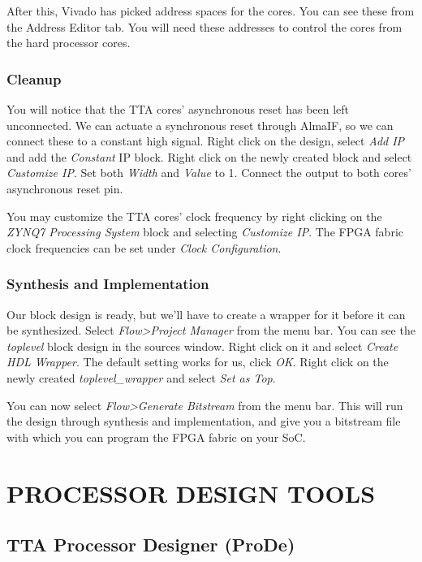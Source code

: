 \documentclass[twoside]{tceusermanual}
\begin{document}
After this, Vivado has picked address spaces for the cores. You can see these
from the Address Editor tab. You will need these addresses to control the cores
from the hard processor cores.

\subsection{Cleanup}

You will notice that the TTA cores' asynchronous reset has been left
unconnected. We can actuate a synchronous reset through AlmaIF, so we can
connect these to a constant high signal. Right click on the design, select
\textit{Add IP} and add the \textit{Constant} IP block. Right click on the
newly created block and select \textit{Customize IP}. Set both \textit{Width}
and \textit{Value} to 1. Connect the output to both cores' asynchronous reset
pin.

You may customize the TTA cores' clock frequency by right clicking on the
\textit{ZYNQ7 Processing System} block and selecting \textit{Customize IP}.
The FPGA fabric clock frequencies can be set under \textit{Clock Configuration}.

\subsection{Synthesis and Implementation}

Our block design is ready, but we'll have to create a wrapper for it before
it can be synthesized. Select \textit{Flow>Project Manager} from the menu bar.
You can see the \textit{toplevel} block design in the sources window. Right
click on it and select \textit{Create HDL Wrapper}. The default setting works
for us, click \textit{OK}. Right click on the newly created
\textit{toplevel\_wrapper} and select \textit{Set as Top}.

You can now select \textit{Flow>Generate Bitstream} from the menu bar. This will
run the design through synthesis and implementation, and give you a bitstream
file with which you can program the FPGA fabric on your SoC.

\chapter{PROCESSOR DESIGN TOOLS}
\label{chapter:procgen}

\section{TTA Processor Designer (ProDe)}
\label{sec:prode}
\end{document}
